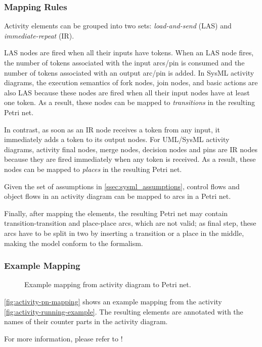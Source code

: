 \subsubsection{Mapping Rules}


Activity elements can be grouped into two sets: \emph{load-and-send} (LAS) and \emph{immediate-repeat} (IR).

LAS nodes are fired when all their inputs have tokens. When an LAS node fires, the number of tokens associated with the input arcs/pin is consumed and the number of tokens associated with an output arc/pin is added. In SysML activity diagrams, the execution semantics of fork nodes, join nodes, and basic actions are also LAS because these nodes are fired when all their input nodes have at least one token. As a result, these nodes can be mapped to \emph{transitions} in the resulting Petri net.

In contrast, as soon as an IR node receives a token from any input, it immediately adds a token to its output nodes. For UML/SysML activity diagrams, activity final nodes, merge nodes, decision nodes and pins are IR nodes because they are fired immediately when any token is received. As a result, these nodes can be mapped to \emph{places} in the resulting Petri net.

Given the set of assumptions in \autoref{ssec:sysml_assumptions}, control flows and object flows in an activity diagram can be mapped to arcs in a Petri net.

Finally, after mapping the elements, the resulting Petri net may contain transition-transition and place-place arcs, which are not valid; as final step, these arcs have to be split in two by inserting a transition or a place in the middle, making the model conform to the formalism.

\subsubsection{Example Mapping}

\begin{figure}[!ht]
	\centering
	
	\caption{Example mapping from activity diagram to Petri net.}
	\label{fig:activity-pn-mapping}
\end{figure}

\autoref{fig:activity-pn-mapping} shows an example mapping from the activity \autoref{fig:activity-running-example}. The resulting elements are annotated with the names of their counter parts in the activity diagram.

For more information, please refer to \cite{https://doi.org/10.1002/sys.21524}!